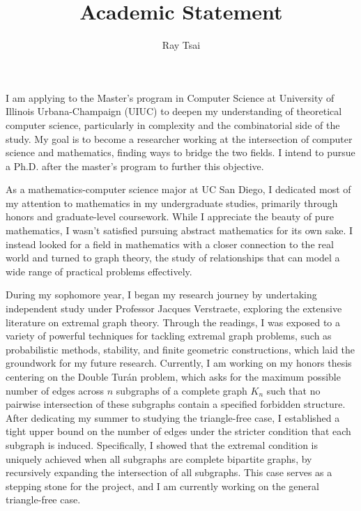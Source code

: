 \documentclass[12pt]{article}
\title{Academic Statement}
\author{Ray Tsai}
\date{}
\begin{document}
\maketitle

\vspace{-0.25in}

I am applying to the Master's program in Computer Science at University of Illinois Urbana-Champaign
(UIUC) to deepen my understanding of theoretical computer science, particularly in complexity and
the combinatorial side of the study. My goal is to become a researcher working at the intersection
of computer science and mathematics, finding ways to bridge the two fields. I intend to pursue a
Ph.D. after the master's program to further this objective.

As a mathematics-computer science major at UC San Diego, I dedicated most of my attention to
mathematics in my undergraduate studies, primarily through honors and graduate-level coursework.
While I appreciate the beauty of pure mathematics, I wasn't satisfied pursuing abstract mathematics
for its own sake. I instead looked for a field in mathematics with a closer connection to the real
world and turned to graph theory, the study of relationships that can model a wide range of
practical problems effectively.

During my sophomore year, I began my research journey by undertaking independent study under
Professor Jacques Verstraete, exploring the extensive literature on extremal graph theory. Through
the readings, I was exposed to a variety of powerful techniques for tackling extremal graph
problems, such as probabilistic methods, stability, and finite geometric constructions, which laid
the groundwork for my future research. Currently, I am working on my honors thesis centering on the
Double Turán problem, which asks for the maximum possible number of edges across $n$ subgraphs of a
complete graph $K_n$ such that no pairwise intersection of these subgraphs contain a specified
forbidden structure. After dedicating my summer to studying the triangle-free case, I established a
tight upper bound on the number of edges under the stricter condition that each subgraph is induced.
Specifically, I showed that the extremal condition is uniquely achieved when all subgraphs are
complete bipartite graphs, by recursively expanding the intersection of all subgraphs. This case
serves as a stepping stone for the project, and I am currently working on the general triangle-free
case. 
\end{document}
